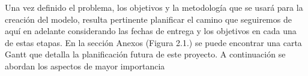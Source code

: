 Una vez definido el problema, los objetivos y la metodología que se usará para la creación del modelo, resulta pertinente planificar el camino que seguiremos de aquí en adelante considerando las fechas de entrega y los objetivos en cada una de estas etapas.
En la sección Anexos (Figura 2.1.) se puede encontrar una carta Gantt que detalla la planificación futura de este proyecto. A continuación se abordan los aspectos de mayor importancia


